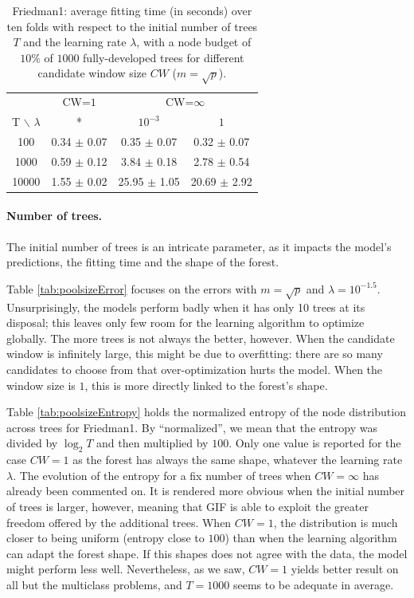 \documentclass{article}
\begin{document}
\begin{table}[t]
\caption{Friedman1: average fitting time (in seconds) over ten folds with 
respect to the initial number of trees $T$ and the learning rate $\lambda$, 
with a node budget of $10\%$ of $1000$ fully-developed trees for different 
candidate window size $CW$ ($m=\sqrt{p}$).}
\label{tab:poolsizeTime}
\begin{center}
\begin{small}
\begin{tabular}{c|c|cc}
\hline
 & CW=$1$ & \multicolumn{2}{c}{CW=$\infty$} \\
T $\backslash$ $\lambda$ & * & $10^{-3}$ &  $1$ \\
\hline
100 & 0.34 $\pm$ 0.07 & 0.35 $\pm$ 0.07 &  0.32 $\pm$ 0.07 \\
1000 & 0.59 $\pm$ 0.12 & 3.84 $\pm$ 0.18 & 2.78 $\pm$ 0.54 \\
10000 & 1.55 $\pm$ 0.02 & 25.95 $\pm$ 1.05 & 20.69 $\pm$ 
2.92 \\
\hline
\end{tabular}
\end{small}
\end{center}
\vskip -0.1in
\end{table}

\paragraph{Number of trees.}
The initial number of trees is an intricate parameter, as it impacts the 
model's predictions, the fitting time and the shape of the forest.

Table \ref{tab:poolsizeError} focuses on the errors with $m=\sqrt{p}$ and 
$\lambda=10^{-1.5}$. Unsurprisingly, the models perform badly when it has only 
10 trees at its disposal; this leaves only few room for the learning algorithm 
to optimize globally. The more trees is not always the better, however. When 
the candidate window is infinitely large, this might be due to overfitting: 
there are so many candidates to choose from that over-optimization hurts the 
model. When the window size is $1$, this is more directly linked to the 
forest's shape.

Table \ref{tab:poolsizeEntropy} holds the normalized entropy of the node 
distribution across trees for Friedman1. 
By ``normalized'', we mean that the entropy was divided by $\log_2 T$ and then 
multiplied by $100$.
Only one value is reported for the case $CW=1$ as the forest has always the 
same shape, whatever the learning rate $\lambda$. The evolution of the entropy 
for a fix number of trees when $CW=\infty$ has already been commented on. 
It is rendered more obvious when the initial number of trees is larger, 
however, meaning that GIF is able to exploit the greater freedom offered by the 
additional trees. 
When $CW=1$, the distribution is much closer to being uniform (entropy 
close to $100$) than when the learning algorithm can adapt the forest shape. 
If this shapes does not agree with the data, the model might perform less well. 
Nevertheless, as we saw, $CW=1$ yields better result on all but the multiclass 
problems, and $T=1000$ seems to be adequate in average. %
\end{document}
